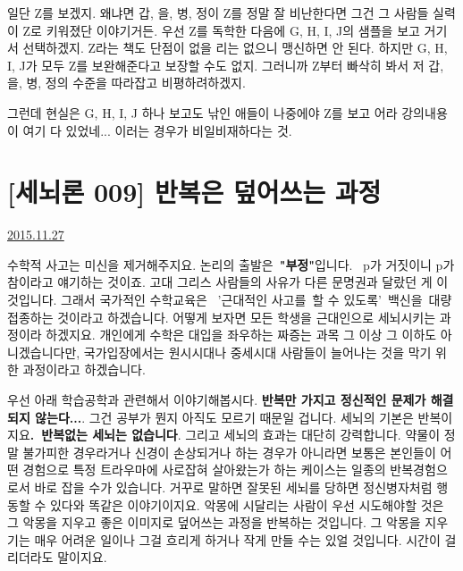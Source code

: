 일단 Z를 보겠지. 왜냐면 갑, 을, 병, 정이 Z를 정말 잘 비난한다면 그건 그 사람들 실력이 Z로 키워졌단 이야기거든.
우선 Z를 독학한 다음에 G, H, I, J의 샘플을 보고 거기서 선택하겠지.
Z라는 책도 단점이 없을 리는 없으니 맹신하면 안 된다. 하지만 G, H, I, J가 모두 Z를 보완해준다고 보장할 수도 없지.
그러니까 Z부터 빠삭히 봐서 저 갑, 을, 병, 정의 수준을 따라잡고 비평하려하겠지.
\vspace{5mm}

그런데 현실은 G, H, I, J 하나 보고도 낚인 애들이 나중에야 Z를 보고 어라 강의내용이 여기 다 있었네... 이러는 경우가 비일비재하다는 것.
\vspace{5mm}







\section{[세뇌론 009] 반복은 덮어쓰는 과정}
\href{https://www.kockoc.com/Apoc/513169}{2015.11.27}

\vspace{5mm}

수학적 사고는 미신을 제거해주지요.
논리의 출발은 \textbf{"부정"}입니다. ~p가 거짓이니 p가 참이라고 얘기하는 것이죠.
고대 그리스 사람들의 사유가 다른 문명권과 달랐던 게 이것입니다.
그래서 국가적인 수학교육은  '근대적인 사고를 할 수 있도록' 백신을 대량접종하는 것이라고 하겠습니다.
어떻게 보자면 모든 학생을 근대인으로 세뇌시키는 과정이라 하겠지요.
개인에게 수학은 대입을 좌우하는 짜증는 과목 그 이상 그 이하도 아니겠습니다만,
국가입장에서는 원시시대나 중세시대 사람들이 늘어나는 것을 막기 위한 과정이라고 하겠습니다.
\vspace{5mm}

우선 아래 학습공학과 관련해서 이야기해봅시다.
\textbf{\textbf{반복}만 가지고 정신적인 문제가 해결되지 않는다...}. 그건 공부가 뭔지 아직도 모르기 때문일 겁니다.
세뇌의 기본은 반복이지요\textbf{. 반복없는 세뇌는 없습니다}. 그리고 세뇌의 효과는 대단히 강력합니다.
약물이 정말 불가피한 경우라거나 신경이 손상되거나 하는 경우가 아니라면
보통은 본인들이 어떤 경험으로 특정 트라우마에 사로잡혀 살아왔는가 하는 케이스는 일종의 반복경험으로서 바로 잡을 수가 있습니다.
거꾸로 말하면 잘못된 세뇌를 당하면 정신병자처럼 행동할 수 있다와 똑같은 이야기이지요.
악몽에 시달리는 사람이 우선 시도해야할 것은 그 악몽을 지우고 좋은 이미지로 덮어쓰는 과정을 반복하는 것입니다.
그 악몽을 지우기는 매우 어려운 일이나 그걸 흐리게 하거나 작게 만들 수는 있얼 것입니다. 시간이 걸리더라도 말이지요.
\vspace{5mm}

